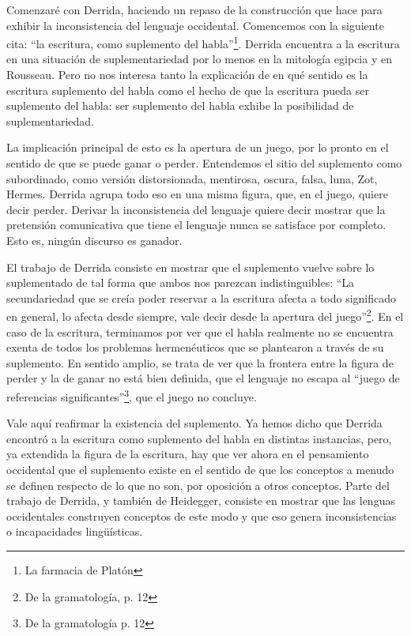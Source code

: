 Comenzaré con Derrida, haciendo un repaso de
la construcción que hace para exhibir la
inconsistencia del lenguaje occidental.
Comencemos con la siguiente cita: ``la
escritura, como suplemento del
habla''\footnote{La farmacia de Platón}.
Derrida encuentra a la escritura en una
situación de suplementariedad por lo menos en
la mitología egipcia y en Rousseau. Pero no
nos interesa tanto la explicación de en qué
sentido es la escritura suplemento del habla
como el hecho de que la escritura pueda ser
suplemento del habla: ser suplemento del
habla exhibe la posibilidad de
suplementariedad.

La implicación principal de esto es la
apertura de un juego, por lo pronto en el
sentido de que se puede ganar o perder.
Entendemos el sitio del suplemento como
subordinado, como versión distorsionada,
mentirosa, oscura, falsa, luna, Zot, Hermes.
Derrida agrupa todo eso en una misma figura,
que, en el juego, quiere decir perder.
Derivar la inconsistencia del lenguaje quiere
decir mostrar que la pretensión comunicativa
que tiene el lenguaje nunca se satisface por
completo. Esto es, ningún discurso es
ganador.

El trabajo de Derrida consiste en mostrar que
el suplemento vuelve sobre lo suplementado de
tal forma que ambos nos parezcan
indistinguibles: ``La secundariedad que se
creía poder reservar a la escritura afecta a
todo significado en general, lo afecta desde
siempre, vale decir desde la apertura del
juego''\footnote{De la gramatología, p. 12}.
En el caso de la escritura, terminamos por
ver que el habla realmente no se encuentra
exenta de todos los problemas hermenéuticos
que se plantearon a través de su suplemento.
En sentido amplio, se trata de ver que la
frontera entre la figura de perder y la de
ganar no está bien definida, que el lenguaje
no escapa al ``juego de referencias
significantes''\footnote{De la gramatología
p. 12}, que el juego no concluye.

Vale aquí reafirmar la existencia del
suplemento. Ya hemos dicho que Derrida
encontró a la escritura como suplemento del
habla en distintas instancias, pero, ya
extendida la figura de la escritura, hay que
ver ahora en el pensamiento occidental que el
suplemento existe en el sentido de que los
conceptos a menudo se definen respecto de lo
que no son, por oposición a otros conceptos.
Parte del trabajo de Derrida, y también de
Heidegger, consiste en mostrar que las
lenguas occidentales construyen conceptos de
este modo y que eso genera inconsistencias o
incapacidades lingüísticas.

